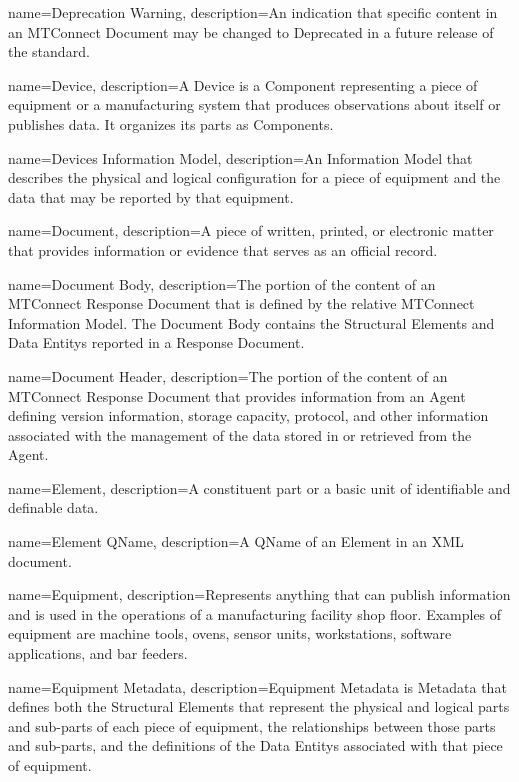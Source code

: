 {
    name={Deprecation Warning},
	description={An indication that specific content in an \gls{MTConnect Document} may be changed to \gls{Deprecated} in a future release of the standard.}
}

{
    name={Device},
	description={A \gls{Device} is a \gls{Component} representing a piece of equipment or a manufacturing system that produces observations about itself or publishes data. It organizes its parts as \glspl{Component}.}
}

{
    name={Devices Information Model},
	description={An \gls{Information Model} that describes the physical and logical configuration for a piece of equipment and the data that may be reported by that equipment. }
}

{
    name={Document},
	description={A piece of written, printed, or electronic matter that provides information or evidence that serves as an official record.}
}

{
    name={Document Body},
	description={The portion of the content of an \gls{MTConnect Response Document} that is defined by the relative \gls{MTConnect Information Model}. The \gls{Document Body} contains the \glspl{Structural Element} and \glspl{Data Entity} reported in a \gls{Response Document}.
}
}

{
    name={Document Header},
	description={The portion of the content of an \gls{MTConnect Response Document} that provides information from an \gls{Agent} defining version information, storage capacity, protocol, and other information associated with the management of the data stored in or retrieved from the \gls{Agent}.
}
}

{
    name={Element},
	description={A constituent part or a basic unit of identifiable and definable data.}
}

{
    name={Element QName},
	description={A \gls{QName} of an \gls{Element} in an XML document.}
}

{
    name={Equipment},
	description={Represents anything that can publish information and is used in the operations of a manufacturing facility shop floor.  Examples of equipment are machine tools, ovens, sensor units, workstations, software applications, and bar feeders.}
}

{
    name={Equipment Metadata},
	description={\gls{Equipment Metadata} is {{Metadata}} that defines both the \glspl{Structural Element} that represent the physical and logical parts and sub-parts of each piece of equipment, the relationships between those parts and sub-parts, and the definitions of the \glspl{Data Entity} associated with that piece of equipment.}
}

